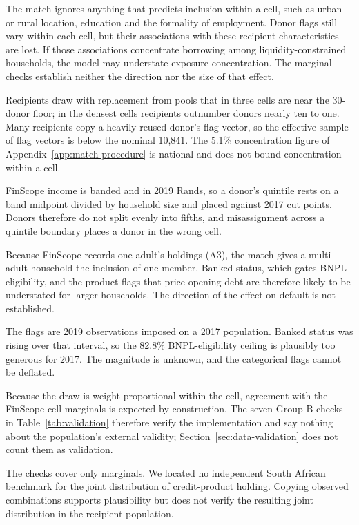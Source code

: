 \begin{description}[style=unboxed]
\item[P1. Within-cell heterogeneity.] The match ignores anything that predicts inclusion within a
cell, such as urban or rural location, education and the formality of employment. Donor flags
still vary within each cell, but their associations with these recipient characteristics are
lost. If those associations concentrate borrowing among liquidity-constrained households, the
model may understate exposure concentration. The marginal checks establish neither the direction
nor the size of that effect.
\item[P2. Small-cell donor reuse.] Recipients draw with replacement from pools that in three
cells are near the 30-donor floor; in the densest cells recipients outnumber donors nearly ten
to one. Many recipients copy a heavily reused donor's flag vector, so the effective sample of
flag vectors is below the nominal 10{,}841. The 5.1\% concentration figure of
Appendix~\ref{app:match-procedure} is national and does not bound concentration within a cell.
\item[P3. Matching-key error.] \ac{FinScope} income is banded and in 2019 Rands, so a donor's
quintile rests on a band midpoint divided by household size and placed against 2017 cut points.
Donors therefore do not split evenly into fifths, and misassignment across a quintile boundary
places a donor in the wrong cell.
\item[P4. Respondent, not household.] Because \ac{FinScope} records one adult's holdings
(A3), the match gives a multi-adult household the inclusion of one member. Banked status, which gates
\ac{BNPL} eligibility, and the product flags that price opening debt are therefore likely to be
understated for larger households. The direction of the effect on default is not established.
\item[P5. Vintage.] The flags are 2019 observations imposed on a 2017 population. Banked status
was rising over that interval, so the 82.8\% \ac{BNPL}-eligibility ceiling is plausibly
too generous for 2017. The magnitude is unknown, and the categorical flags cannot be deflated.
\item[P6. Group B validation is a construction check.] Because the draw is weight-proportional
within the cell, agreement with the \ac{FinScope} cell marginals is expected by construction.
The seven Group B checks in Table~\ref{tab:validation} therefore verify the implementation and
say nothing about the population's external validity; Section~\ref{sec:data-validation} does not
count them as validation.
\item[P7. The joint distribution is never externally validated.] The checks cover only
marginals. We located no independent South African benchmark for the joint distribution of
credit-product holding. Copying observed combinations supports plausibility but does not verify
the resulting joint distribution in the recipient population.
\end{description}

